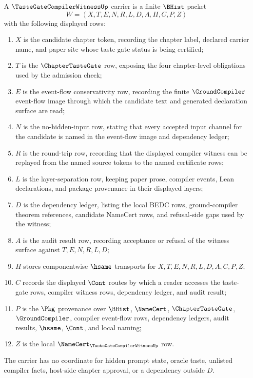 \begin{definition}
\label{def:taste-gate-compiler-witness-carrier}
A $\TasteGateCompilerWitnessUp$ carrier is a finite $\BHist$ packet
$$
W=(X,T,E,N,R,L,D,A,H,C,P,Z)
$$
with the following displayed rows:
\begin{enumerate}
\item $X$ is the candidate chapter token, recording the chapter label, declared carrier name, and paper site whose taste-gate status is being certified;
\item $T$ is the $\ChapterTasteGate$ row, exposing the four chapter-level obligations used by the admission check;
\item $E$ is the event-flow conservativity row, recording the finite $\GroundCompiler$ event-flow image through which the candidate text and generated declaration surface are read;
\item $N$ is the no-hidden-input row, stating that every accepted input channel for the candidate is named in the event-flow image and dependency ledger;
\item $R$ is the round-trip row, recording that the displayed compiler witness can be replayed from the named source tokens to the named certificate rows;
\item $L$ is the layer-separation row, keeping paper prose, compiler events, Lean declarations, and package provenance in their displayed layers;
\item $D$ is the dependency ledger, listing the local BEDC rows, ground-compiler theorem references, candidate NameCert rows, and refusal-side gaps used by the witness;
\item $A$ is the audit result row, recording acceptance or refusal of the witness surface against $T,E,N,R,L,D$;
\item $H$ stores componentwise $\hsame$ transports for $X,T,E,N,R,L,D,A,C,P,Z$;
\item $C$ records the displayed $\Cont$ routes by which a reader accesses the taste-gate rows, compiler witness rows, dependency ledger, and audit result;
\item $P$ is the $\Pkg$ provenance over $\BHist$, $\NameCert$, $\ChapterTasteGate$, $\GroundCompiler$, compiler event-flow rows, dependency ledgers, audit results, $\hsame$, $\Cont$, and local naming;
\item $Z$ is the local $\NameCert_{\TasteGateCompilerWitnessUp}$ row.
\end{enumerate}
The carrier has no coordinate for hidden prompt state, oracle taste, unlisted compiler facts, host-side chapter approval, or a dependency outside $D$.
\end{definition}

